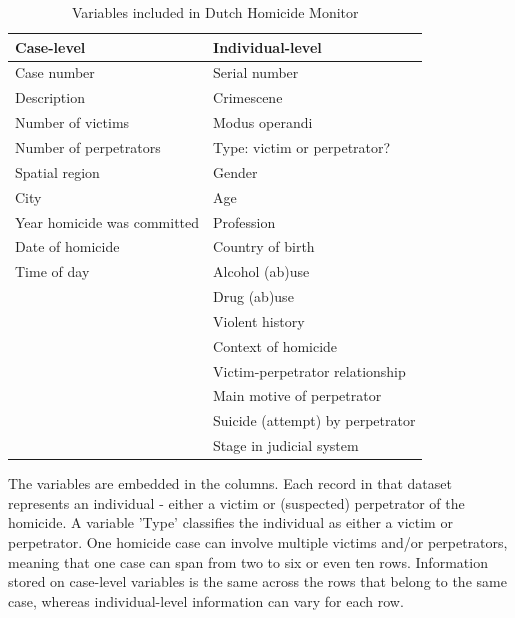 \vspace{10pt}
\begin{table}[H]
\small
\centering
\begin{tabular}{@{}ll@{}}
\toprule
Case-level                  & Individual-level                 \\ \midrule
Case number                 & Serial number                    \\
Description                 & Crimescene                       \\
Number of victims           & Modus operandi                   \\
Number of perpetrators      & Type: victim or perpetrator?     \\
Spatial region              & Gender                           \\
City                        & Age                              \\
Year homicide was committed & Profession                       \\
Date of homicide            & Country of birth                 \\
Time of day                 & Alcohol (ab)use                  \\
                            & Drug (ab)use                     \\
                            & Violent history                  \\
                            & Context of homicide              \\
                            & Victim-perpetrator relationship  \\
                            & Main motive of perpetrator       \\
                            & Suicide (attempt) by perpetrator \\
                            & Stage in judicial system         \\ \bottomrule
\end{tabular}
\caption{Variables included in Dutch Homicide Monitor}
\label{tab:my-table}
\end{table}
\vspace{10pt}


The variables are embedded in the columns. Each record in that dataset represents an individual - either a victim or (suspected) perpetrator of the homicide. A variable 'Type' classifies the individual as either a victim or perpetrator. One homicide case can involve multiple victims and/or perpetrators, meaning that one case can span from two to six or even ten rows. Information stored on case-level variables is the same across the rows that belong to the same case, whereas individual-level information can vary for each row. 

